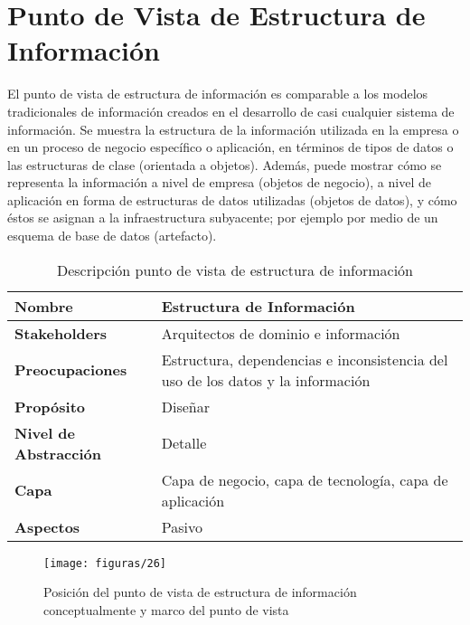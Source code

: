 \section{Punto de Vista de Estructura de Información}
El punto de vista de estructura de información es comparable a los modelos tradicionales de información creados en el desarrollo de casi cualquier sistema de información. Se muestra la estructura de la información utilizada en la empresa o en un proceso de negocio específico o aplicación, en términos de tipos de datos o las estructuras de clase (orientada a objetos). Además, puede mostrar cómo se representa la información a nivel
de empresa (objetos de negocio), a nivel de aplicación en forma de estructuras de datos utilizadas (objetos de datos), y cómo éstos se asignan a la infraestructura subyacente; por ejemplo por medio de un esquema de base de datos (artefacto).
    
    \begin{table}[H]
    	\centering
    	\begin{tabular}{p{3.7cm}p{8cm}}
    		\hline
    		\rowcolor[HTML]{0073a1}
    		{\color[HTML]{FFFFFF} \textbf{Nombre}} & {\color[HTML]{FFFFFF} \textbf{Estructura de Información}} \\
    		\hline
    		\textbf{Stakeholders} & Arquitectos de dominio e información \\
    		\textbf{Preocupaciones} & Estructura, dependencias e inconsistencia del uso de los datos y la información  \\
    		\textbf{Propósito} & Diseñar \\
    		\textbf{Nivel de Abstracción} & Detalle \\
    		\textbf{Capa} & Capa de negocio, capa de tecnología, capa de aplicación \\
    		\textbf{Aspectos} & Pasivo \\
    		\bottomrule
    	\end{tabular}
    	\captionsetup{width=.95\textwidth}
    	\caption{Descripción punto de vista de estructura de información}
    	\label{tabla17}
    \end{table}
    
    \begin{figure}[H]
    	\centering
    	\texttt{[image: figuras/26]}
    	\captionsetup{width=.95\textwidth}
    	\caption{Posición del punto de vista de estructura de información conceptualmente y marco del punto de vista}
    	\label{figura26}
    \end{figure}
    
